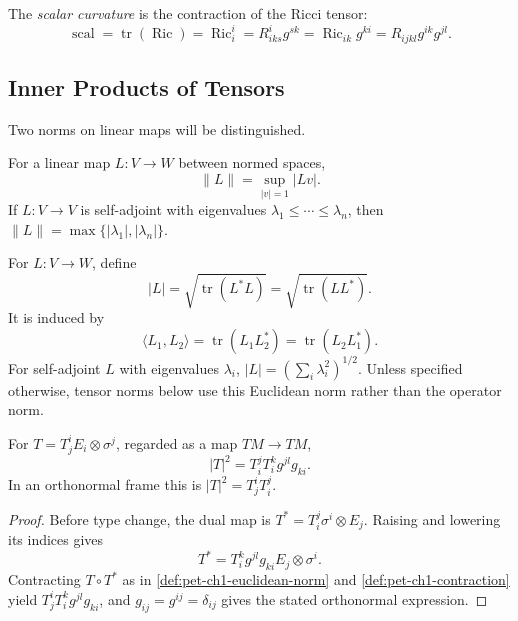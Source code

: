 \begin{definition}
  \label{def:pet-ch1-scalar-curvature}
  \leanok
  The \emph{scalar curvature} is the contraction of the Ricci tensor:
  \[
    \operatorname{scal}
      =\operatorname{tr}(\operatorname{Ric})
      =\operatorname{Ric}^i_i
      =R^i_{iks}g^{sk}
      =\operatorname{Ric}_{ik}g^{ki}
      =R_{ijkl}g^{ik}g^{jl}.
  \]
\end{definition}

\subsection{Inner Products of Tensors}

Two norms on linear maps will be distinguished.

\begin{definition}
  \label{def:pet-ch1-operator-norm}
  \leanok
  For a linear map $L:V\to W$ between normed spaces,
  \[
    \|L\|=\sup_{|v|=1}|Lv|.
  \]
  If $L:V\to V$ is self-adjoint with eigenvalues
  $\lambda_1\le\cdots\le\lambda_n$, then
  $\|L\|=\max\{|\lambda_1|,|\lambda_n|\}$.
\end{definition}

\begin{definition}
  \label{def:pet-ch1-euclidean-norm}
  \leanok
  For $L:V\to W$, define
  \[
    |L|=\sqrt{\operatorname{tr}(L^*L)}
      =\sqrt{\operatorname{tr}(LL^*)}.
  \]
  It is induced by
  \[
    \langle L_1,L_2\rangle
      =\operatorname{tr}(L_1L_2^*)
      =\operatorname{tr}(L_2L_1^*).
  \]
  For self-adjoint $L$ with eigenvalues $\lambda_i$,
  $|L|=(\sum_i\lambda_i^2)^{1/2}$. Unless specified otherwise, tensor norms
  below use this Euclidean norm rather than the operator norm.
\end{definition}

\begin{proposition}
  \label{prop:pet-ch1-norm-11-tensor}
  \leanok
  For $T=T^i_jE_i\otimes\sigma^j$, regarded as a map $TM\to TM$,
  \[
    |T|^2=T^j_iT^k_i g^{jl}g_{ki}.
  \]
  In an orthonormal frame this is $|T|^2=T^i_jT^j_i$.
\end{proposition}
\begin{proof}
  \leanok
  \sketch
  Before type change, the dual map is
  $T^*=T^j_i\sigma^i\otimes E_j$. Raising and lowering its indices gives
  \[
    T^*=T^k_i g^{jl}g_{ki}E_j\otimes\sigma^i.
  \]
  Contracting $T\circ T^*$ as in
  \cref{def:pet-ch1-euclidean-norm} and
  \cref{def:pet-ch1-contraction} yield
  $T^i_jT^k_i g^{jl}g_{ki}$, and $g_{ij}=g^{ij}=\delta_{ij}$ gives the stated
  orthonormal expression.
\end{proof}


